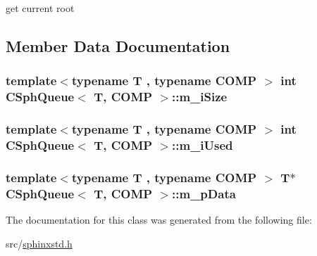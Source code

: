 get current root 



\subsection{Member Data Documentation}
\hypertarget{classCSphQueue_adff4c65de0a550843aa28c3bd77a8597}{
\subsubsection[{m\-\_\-i\-Size}]{\setlength{\rightskip}{0pt plus 5cm}template$<$typename T , typename C\-O\-M\-P $>$ {\bf int} {\bf C\-Sph\-Queue}$<$ T, C\-O\-M\-P $>$\-::m\-\_\-i\-Size\hspace{0.3cm}{\ttfamily [protected]}}}\label{classCSphQueue_adff4c65de0a550843aa28c3bd77a8597}
\hypertarget{classCSphQueue_a691cd46976be3de890c015333edc5c0a}{
\subsubsection[{m\-\_\-i\-Used}]{\setlength{\rightskip}{0pt plus 5cm}template$<$typename T , typename C\-O\-M\-P $>$ {\bf int} {\bf C\-Sph\-Queue}$<$ T, C\-O\-M\-P $>$\-::m\-\_\-i\-Used\hspace{0.3cm}{\ttfamily [protected]}}}\label{classCSphQueue_a691cd46976be3de890c015333edc5c0a}
\hypertarget{classCSphQueue_a883105a8c3a9f6026cd38685165647f8}{
\subsubsection[{m\-\_\-p\-Data}]{\setlength{\rightskip}{0pt plus 5cm}template$<$typename T , typename C\-O\-M\-P $>$ T$\ast$ {\bf C\-Sph\-Queue}$<$ T, C\-O\-M\-P $>$\-::m\-\_\-p\-Data\hspace{0.3cm}{\ttfamily [protected]}}}\label{classCSphQueue_a883105a8c3a9f6026cd38685165647f8}


The documentation for this class was generated from the following file\-:\begin{DoxyCompactItemize}
\item 
src/\hyperlink{sphinxstd_8h}{sphinxstd.\-h}\end{DoxyCompactItemize}
